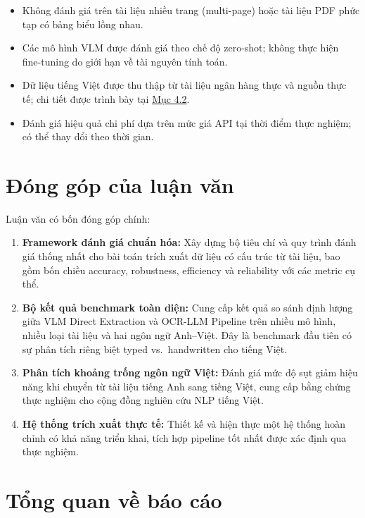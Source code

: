 ﻿\documentclass[12pt]{report}
\begin{document}
\begin{itemize}
    \item Không đánh giá trên tài liệu nhiều trang (multi-page) hoặc tài liệu PDF phức tạp có bảng biểu lồng nhau.
    \item Các mô hình VLM được đánh giá theo chế độ zero-shot; không thực hiện fine-tuning do giới hạn về tài nguyên tính toán.
    \item Dữ liệu tiếng Việt được thu thập từ tài liệu ngân hàng thực và nguồn thực tế; chi tiết được trình bày tại \hyperref[sec:datasets]{Mục 4.2}.
    \item Đánh giá hiệu quả chi phí dựa trên mức giá API tại thời điểm thực nghiệm; có thể thay đổi theo thời gian.
\end{itemize}

\section{Đóng góp của luận văn}\label{sec:donggop}

Luận văn có bốn đóng góp chính:

\begin{enumerate}
    \item \textbf{Framework đánh giá chuẩn hóa:} Xây dựng bộ tiêu chí và quy trình đánh giá thống nhất cho bài toán trích xuất dữ liệu có cấu trúc từ tài liệu, bao gồm bốn chiều accuracy, robustness, efficiency và reliability với các metric cụ thể.

    \item \textbf{Bộ kết quả benchmark toàn diện:} Cung cấp kết quả so sánh định lượng giữa VLM Direct Extraction và OCR-LLM Pipeline trên nhiều mô hình, nhiều loại tài liệu và hai ngôn ngữ Anh--Việt. Đây là benchmark đầu tiên có sự phân tích riêng biệt typed vs.\ handwritten cho tiếng Việt.

    \item \textbf{Phân tích khoảng trống ngôn ngữ Việt:} Đánh giá mức độ sụt giảm hiệu năng khi chuyển từ tài liệu tiếng Anh sang tiếng Việt, cung cấp bằng chứng thực nghiệm cho cộng đồng nghiên cứu NLP tiếng Việt.

    \item \textbf{Hệ thống trích xuất thực tế:} Thiết kế và hiện thực một hệ thống hoàn chỉnh có khả năng triển khai, tích hợp pipeline tốt nhất được xác định qua thực nghiệm.
\end{enumerate}

\section{Tổng quan về báo cáo}\label{sec:tongquan}
\end{document}
